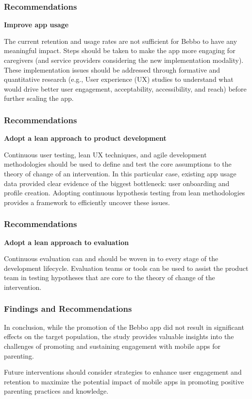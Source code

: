 \documentclass[aspectratio=169]{beamer}
\begin{document}
\begin{frame}
     \frametitle{Recommendations}
\textbf{Improve app usage}

The current retention and usage rates are not sufficient for Bebbo to have any meaningful impact. Steps should be taken to make the app more engaging for caregivers (and service providers considering the new implementation modality). These implementation issues should be addressed through formative and quantitative research  (e.g., User experience (UX) studies to understand what would drive better user engagement, acceptability, accessibility, and reach) before further scaling the app.  

\end{frame}

\begin{frame}
\frametitle{Recommendations}       

\textbf{Adopt a lean approach to product development}

Continuous user testing, lean UX techniques, and agile development methodologies should be used to define and test the core assumptions to the theory of change of an intervention. In this particular case, existing app usage data provided clear evidence of the biggest bottleneck: user onboarding and profile creation. Adopting continuous hypothesis testing from lean methodologies provides a framework to efficiently uncover these issues. 

\end{frame}


\begin{frame}
\frametitle{Recommendations}       

\textbf{Adopt a lean approach to evaluation}

Continuous evaluation can and should be woven in to every stage of the development lifecycle. Evaluation teams or tools can be used to assist the product team in testing hypotheses that are core to the theory of change of the intervention.

\end{frame}


\begin{frame}
   \frametitle{Findings and Recommendations}

  In conclusion, while the promotion of the Bebbo app did not result in significant effects on the target population, the study provides valuable insights into the challenges of promoting and sustaining engagement with mobile apps for parenting. 

Future interventions should consider strategies to enhance user engagement and retention to maximize the potential impact of mobile apps in promoting positive parenting practices and knowledge. 
\end{frame}
\end{document}
